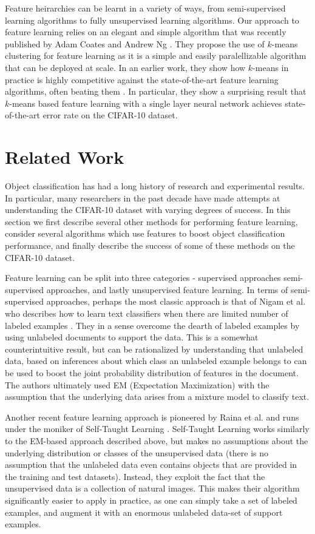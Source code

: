 \documentclass{article} %
\begin{document}
Feature heirarchies can be learnt in a variety of ways, from semi-supervised learning
algorithms to fully unsupervised learning algorithms. 
Our approach to feature learning relies on an elegant and simple algorithm that was
recently published by Adam Coates and Andrew Ng \cite{coates}. They propose the use
of $k$-means clustering for feature learning as it is a simple and easily paralellizable
algorithm that can be deployed at scale. In an earlier work, they show how $k$-means in 
practice is highly competitive against the state-of-the-art feature learning algorithms, 
often beating them \cite{coates11}. In particular, they show a surprising result that 
$k$-means based feature learning with a single layer neural network achieves state-of-the-art
error rate on the CIFAR-10 dataset. 


\section{Related Work}

Object classification has had a long history of research and experimental results. In 
particular, many researchers in the past decade have made attempts at understanding the 
CIFAR-10 dataset with varying degrees of success. In this section we first describe
several other methods for performing feature learning, consider several algorithms which
use features to boost object classification performance, and finally describe the success
of some of these methods on the CIFAR-10 dataset. 

Feature learning can be split into three categories - supervised approaches
semi-supervised approaches, and lastly unsupervised feature learning. 
In terms of semi-supervised approaches, perhaps the most classic approach is that of 
Nigam et al. who describes how to 
learn text classifiers when there are limited number of labeled examples \cite{nigam}. 
They in a sense
overcome the dearth of labeled examples by using unlabeled documents to support the data.
This is a somewhat counterintuitive result, but can be rationalized by understanding that
unlabeled data, based on inferences about which class an unlabeled example belongs to can
be used to boost the joint probability distribution of features in the document. The authors
ultimately used EM (Expectation Maximization) with the assumption that the underlying data
arises from a mixture model to classify text. 

Another recent feature learning approach is pioneered by Raina et al. and runs under the 
moniker of Self-Taught Learning \cite{raina}. Self-Taught Learning works similarly to 
the EM-based 
approach described above, but makes no assumptions about the underlying distribution or
classes of the unsupervised data (there is no assumption that the unlabeled data even 
contains objects that are provided in the training and test datasets). Instead, they exploit
the fact that the unsupervised data is a collection of natural images. This makes their
algorithm significantly easier to apply in practice, as one can simply take a set of labeled
examples, and augment it with an enormous unlabeled data-set of support examples.
\end{document}
